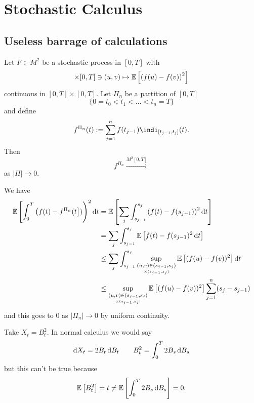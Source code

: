 \documentclass[12pt]{report}
\begin{document}
\chapter{Stochastic Calculus}
\section{Useless barrage of calculations}
\begin{lemma}
	Let $F\in M^{2}$ be a stochastic process in $[0,T]$ with
	\begin{equation*}
		[0,T]\times[0,T]\ni(u,v)\mapsto\ev{\left(f(u)-f(v)\right)^{2}}
	\end{equation*}
	continuous in $[0,T]\times[0,T]$. Let $\Pi_{n}$ be a partition of $[0,T]$
	\begin{equation*}
		\{0=t_{0}<t_{1}<\ldots<t_{n}=T\}
	\end{equation*}and define
	\begin{equation*}
		f^{\Pi_{n}}(t):=\sum_{j=1}^{n}f(t_{j-1})\indi_{[t_{j-1},t_{j}]}(t).
	\end{equation*}
	Then 
	\begin{equation*}
		f^{\Pi_{n}}\xrightarrow{M^{2}[0,T]}
	\end{equation*}
	as $|\Pi|\to0$.
\end{lemma}
\begin{fancyproof}
	We have
	\begin{align*}
		\mathbb{E}\left[\int_{0}^{T}\left(f(t)-f^{\Pi_{n}}(t\right])\right)^{2}\mathop{}\!\mathrm{d} t&=\mathbb{E}\left[\sum_{j}\int_{s_{j-1}}^{s_{j}}\left(f(t)-f(s_{j-1})\right)^{2}\mathop{}\!\mathrm{d} t\right]\\
		&=\sum_{j}\int_{{s}_{j-1}}^{s_{j}}\mathbb{E}\left[f(t)-f(s_{j-1})^{2}\mathop{}\!\mathrm{d} t\right]\\
		&\leq\sum_{j}\int_{s_{j-1}}^{s_{j}}\sup_{\underset{\times(s_{j-1},s_{j})}{(u,v)\in(s_{j-1},s_{j})}}\mathbb{E}\left[(f(u)-f(v))^{2}\right]\mathop{}\!\mathrm{d} t\\
		&\leq\sup_{\underset{\times(s_{j-1},s_{j})}{(u,v)\in(s_{j-1},s_{j})}}\mathbb{E}\left[(f(u)-f(v))^{2}\right]\sum_{j=1}^{n}(s_{j}-s_{j-1})
	\end{align*}
	and this goes to 0 as $|\Pi_{n}|\to0$ by uniform continuity.
\end{fancyproof}
Take $X_{t}=B^{2}_{t}$. In normal calculus we would say
\begin{equation*}
	\mathop{}\!\mathrm{d} X_{t}=2B_{t}\mathop{}\!\mathrm{d} B_{t}\qquad B^{2}_{t}=\int_{0}^{T}2B_{s}\mathop{}\!\mathrm{d} B_{s}
\end{equation*}
but this can't be true because
\begin{equation*}
	\mathbb{E}\left[B^{2}_{t}\right]=t\neq\mathbb{E}\left[\int_{0}^{T}2B_{s}\mathop{}\!\mathrm{d} B_{s}\right]=0.
\end{equation*}
\end{document}
